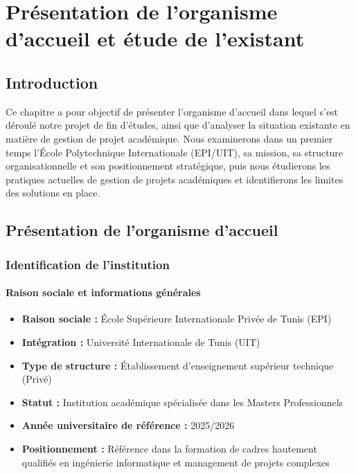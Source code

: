 \chapter{Présentation de l'organisme d'accueil et étude de l'existant}

\section{Introduction}

Ce chapitre a pour objectif de présenter l'organisme d'accueil dans lequel s'est déroulé notre projet de fin d'études, ainsi que d'analyser la situation existante en matière de gestion de projet académique. Nous examinerons dans un premier temps l'École Polytechnique Internationale (EPI/UIT), sa mission, sa structure organisationnelle et son positionnement stratégique, puis nous étudierons les pratiques actuelles de gestion de projets académiques et identifierons les limites des solutions en place.

\section{Présentation de l'organisme d'accueil}

\subsection{Identification de l'institution}

\subsubsection{Raison sociale et informations générales}
\begin{itemize}
    \item \textbf{Raison sociale :} École Supérieure Internationale Privée de Tunis (EPI)
    \item \textbf{Intégration :} Université Internationale de Tunis (UIT)
    \item \textbf{Type de structure :} Établissement d'enseignement supérieur technique (Privé)
    \item \textbf{Statut :} Institution académique spécialisée dans les Masters Professionnels
    \item \textbf{Année universitaire de référence :} 2025/2026
    \item \textbf{Positionnement :} Référence dans la formation de cadres hautement qualifiés en ingénierie informatique et management de projets complexes
\end{itemize}

